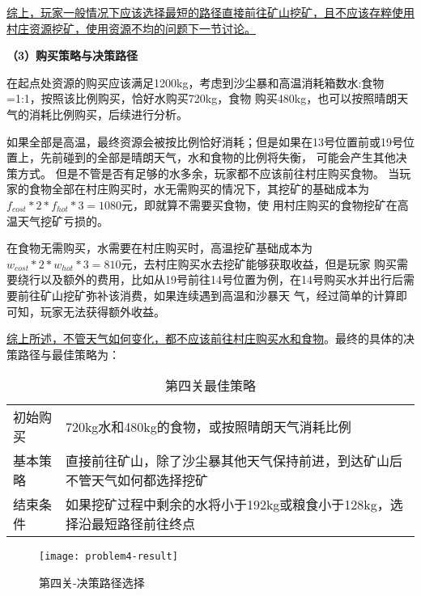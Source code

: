 \documentclass[bwprint]{cumcmthesis} %
\begin{document}
\uline{综上，玩家一般情况下应该选择最短的路径直接前往矿山挖矿，且不应该存粹使用村庄资源挖矿，使用资源不均的问题下一节讨论。}

\textbf{（3）购买策略与决策路径}

在起点处资源的购买应该满足1200kg，考虑到沙尘暴和高温消耗箱数水:食物=1:1，按照该比例购买，恰好水购买720kg，食物
购买480kg，也可以按照晴朗天气的消耗比例购买，后续进行分析。

如果全部是高温，最终资源会被按比例恰好消耗；但是如果在13号位置前或19号位置上，先前碰到的全部是晴朗天气，水和食物的比例将失衡，
可能会产生其他决策方式。
但是不管是否有足够的水多余，玩家都不应该前往村庄购买食物。
当玩家的食物全部在村庄购买时，水无需购买的情况下，其挖矿的基础成本为$f_{cost}*2*f_{hot}*3=1080$元，即就算不需要买食物，使
用村庄购买的食物挖矿在高温天气挖矿亏损的。

在食物无需购买，水需要在村庄购买时，高温挖矿基础成本为$w_{cost}*2*w_{hot}*3=810$元，去村庄购买水去挖矿能够获取收益，但是玩家
购买需要绕行以及额外的费用，比如从19号前往14号位置为例，在14号购买水并出行后需要前往矿山挖矿弥补该消费，如果连续遇到高温和沙暴天
气，经过简单的计算即可知，玩家无法获得额外收益。

\uline{综上所述，不管天气如何变化，都不应该前往村庄购买水和食物}。最终的具体的决策路径与最佳策略为：


\begin{table}[!htbp]
    \caption{第四关最佳策略}\label{tab:strategy} \centering
    \begin{tabular}{p{2cm}p{13cm}}
        \midrule[1pt]
        初始购买 & 720kg水和480kg的食物，或按照晴朗天气消耗比例 \\
        基本策略 & 直接前往矿山，除了沙尘暴其他天气保持前进，到达矿山后不管天气如何都选择挖矿 \\
        结束条件 & 如果挖矿过程中剩余的水将小于192kg或粮食小于128kg，选择沿最短路径前往终点 \\
        \bottomrule[1pt]
    \end{tabular}
\end{table}

\begin{figure}[!h]
    \centering
    \texttt{[image: problem4-result]}
    \caption{第四关-决策路径选择}
    \label{fig:problem4-decision}
\end{figure}
\end{document}

